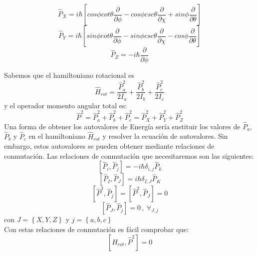 \documentclass[a4paper]{article}
\begin{document}
\begin{equation}
\hat P_X = i\hbar \left[cos\phi cot\theta \frac{\partial}{\partial \phi} - cos\phi csc\theta \frac{\partial}{\partial \chi} + sin\phi \frac{\partial}{\partial \theta} \right]
\end{equation}
\begin{equation}
\hat P_Y = i\hbar \left[sin\phi cot\theta \frac{\partial}{\partial \phi} - sin\phi csc\theta \frac{\partial}{\partial \chi} - cos\phi \frac{\partial}{\partial \theta} \right]
\end{equation}
\begin{equation}
\hat P_Z = -i\hbar\frac{\partial}{\partial\phi} 
\end{equation}

Sabemos que el hamiltoniano rotacional es
\begin{equation}
\hat H_{rot}=\frac{\hat P_a^2}{2I_a}+\frac{\hat P_b^2}{2I_b}+\frac{\hat P_c^2}{2I_c}
\end{equation}
y el operador momento angular total es:
\begin{equation}
\hat P^2 = \hat P_a^2+  \hat P_b^2+  \hat P_c^2 = \hat P_X^2+  \hat P_Y^2+  \hat P_Z^2
\end{equation}
Una forma de obtener los autovalores de Energía sería sustituir los valores de $\hat P_a$, $\hat P_b$ y $\hat P_c$ en el hamiltoniano $\hat H_{rot}$ y resolver la ecuación de autovalores. Sin embargo, estos autovalores se pueden obtener mediante relaciones de conmutación.
Las relaciones de conmutación que necesitaremos son las siguientes:
\begin{equation}
\left[\hat P_i,\hat P_j\right]=-i\hbar\delta_{i,j}\hat P_k
\end{equation}
\begin{equation}
\left[\hat P_I,\hat P_J\right]=i\hbar\delta_{I,J}\hat P_K
\end{equation}
\begin{equation}
\left[\hat P^2,\hat P_j\right]=\left[\hat P^2,\hat P_J\right]=0
\end{equation}
\begin{equation}
\left[\hat P_J,\hat P_j\right]=0 \,,\ \forall_{J,j}
\end{equation}
con $J = \left\lbrace X,Y,Z \right\rbrace$ y $j= \left\lbrace a,b,c \right\rbrace$ \\
Con estas relaciones de conmutación es fácil comprobar que:
\begin{equation}
\left[H_{rot}, \hat P^2 \right] = 0
\end{equation}
\end{document}
